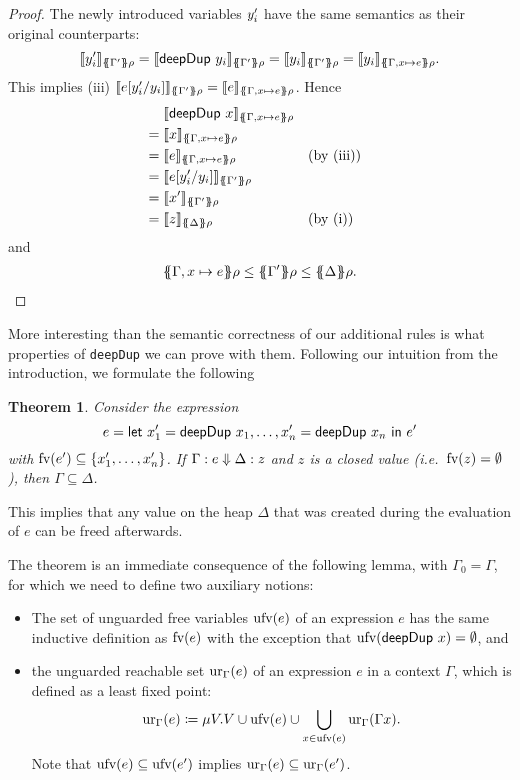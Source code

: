 \documentclass[preprint]{sigplanconf}
\newtheorem{theorem}{Theorem}
\theoremstyle{nonumberplain}
\newtheorem{proof}{Proof}
\newcommand{\li}{\lstinline[style=Haskell]}
\begin{document}
\begin{proof}
The newly introduced variables $y'_i$ have the same semantics as their original counterparts:
\[
\dsem{\fresh y_i}{\esem{\Gamma'}\rho}
= \dsem{\sDeepDup {y_i}}{\esem{\Gamma'}\rho}
= \dsem{y_i}{\esem{\Gamma'}\rho}
= \dsem{y_i}{\esem{\Gamma, x\mapsto e}\rho}.
\]
This implies (iii) $\dsem{e[\fresh y_i/y_i]}{\esem{\Gamma'}\rho} = \dsem{e}{\esem{\Gamma, x\mapsto e}\rho}$. Hence
\begin{align*}
&\phantom{{}={}}\dsem{\sDeepDup x}{\esem{\Gamma, x\mapsto e}\rho}\\
&= \dsem{x}{\esem{\Gamma, x\mapsto e}\rho}\\
&= \dsem{e}{\esem{\Gamma, x\mapsto e}\rho} &&\text{(by (iii))}\\
&= \dsem{e[\fresh y_i/y_i]}{\esem{\Gamma'}\rho}\\
&= \dsem{\fresh x}{\esem{\Gamma'}\rho}\\
&= \dsem{z}{\esem \Delta \rho} &&\text{(by (i))}
\end{align*}
and
\begin{align*}
\esem{\Gamma, x\mapsto e}\rho \le \esem{\Gamma'} \rho \le \esem{\Delta}\rho.
\end{align*}
\end{proof}

More interesting than the semantic correctness of our additional rules is what properties of \li-deepDup- we can prove with them. Following our intuition from the introduction, we formulate the following
\begin{theorem}
Consider the expression
\[
e=\text{\textsf{let}}\ x_1' = \text{\textsf{deepDup}}\ x_1,\ldots,x_n'= \text{\textsf{deepDup}}\ x_n\ \text{\textsf{in}}\ e'
\]
with $\text{fv}(e') \subseteq \{x_1',\ldots,x_n'\}$. If $\Gamma : e \Downarrow \Delta : z$ and $z$ is a closed value (i.e.\ $\text{fv}(z) = \emptyset$), then $\Gamma \subseteq \Delta$.
\label{thm:deepdup}
\end{theorem}
This implies that any value on the heap $\Delta$ that was created during the evaluation of $e$ can be freed afterwards.

The theorem is an immediate consequence of the following lemma, with $\Gamma_0 = \Gamma$, for which we need to define two auxiliary notions:
\begin{itemize}
\item 
The set of unguarded free variables $\text{ufv}(e)$ of an expression $e$ has the same inductive definition as $\text{fv}(e)$ with the exception that $\text{ufv}(\text{\textsf{deepDup}}\ x) = \emptyset$, and 
\item the unguarded reachable set $\text{ur}_{\Gamma}(e)$ of an expression $e$ in a context $\Gamma$, which is defined as a least fixed point:
\[
\text{ur}_{\Gamma}(e) \coloneqq \mu V. V \cup \text{ufv}(e) \cup \bigcup_{x\in \text{ufv}(e)}\text{ur}_{\Gamma}(\Gamma x).
\]
Note that $\text{ufv}(e) \subseteq \text{ufv}(e')$ implies $\text{ur}_{\Gamma}(e) \subseteq \text{ur}_{\Gamma}(e')$.
\end{itemize}
\end{document}
